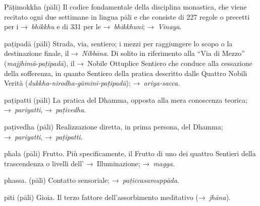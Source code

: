 \begin{glossarydescription}
\item[Pāṭimokkha] (pāli) Il codice fondamentale della disciplina monastica, che
  viene recitato ogni due settimane in lingua pāli e che consiste di 227 regole
  o precetti per i →~\emph{bhikkhu} e di 331 per le →~\emph{bhikkhunī};
  →~\emph{Vinaya}.

\item[paṭipadā] (pāli) Strada, via, sentiero; i mezzi per raggiungere lo scopo o
  la destinazione finale, il →~\emph{Nibbāna}. Di solito in riferimento alla
  ``Via di Mezzo'' (\emph{majjhimā}-\emph{paṭipadā}), il →~Nobile Ottuplice
  Sentiero che conduce alla cessazione della sofferenza, in quanto Sentiero
  della pratica descritto dalle Quattro Nobili Verità
  (\emph{dukkha-nirodha-gāminī-paṭipadā}); →~\emph{ariya-sacca}.

\item[paṭipatti] (pāli) La pratica del Dhamma, opposta alla mera conoscenza
  teorica; →~\emph{pariyatti}, →~\emph{paṭivedha}.

\item[paṭivedha] (pāli) Realizzazione diretta, in prima persona, del Dhamma;
  →~\emph{pariyatti}, →~\emph{paṭipatti}.

\item[phala] (pāli) Frutto. Più specificamente, il Frutto di uno dei quattro
  Sentieri della trascendenza o livelli dell' →~Illuminazione; →~\emph{magga.}

\item[phassa.] (pāli) Contatto sensoriale; →~\emph{paṭiccasamuppāda}.

\item[pīti] (pāli) Gioia. Il terzo fattore dell'assorbimento meditativo
  (→~\emph{jhāna}).


\end{glossarydescription}
